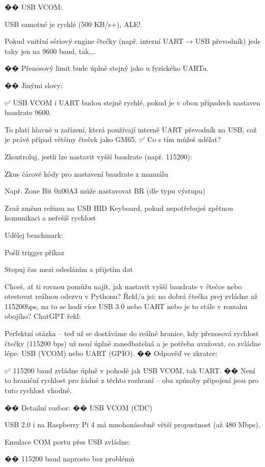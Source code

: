 �� USB VCOM:

    USB samotné je rychlé (500 KB/s+), ALE!

    Pokud vnitřní sériový engine čtečky (např. interní UART → USB převodník) jede taky jen na 9600 baud, tak...

    �� Přenosový limit bude úplně stejný jako u fyzického UARTu.

�� Jinými slovy:

    ✅ USB VCOM i UART budou stejně rychlé, pokud je v obou případech nastaven baudrate 9600.

To platí hlavně u zařízení, která používají interně UART převodník na USB, což je právě případ většiny čteček jako GM65.
✅ Co s tím můžeš udělat?

    Zkontroluj, jestli lze nastavit vyšší baudrate (např. 115200):

        Zkus čárové kódy pro nastavení baudrate z manuálu

        Např. Zone Bit 0x00A3 může nastavovat BR (dle typu výstupu)

    Zvaž změnu režimu na USB HID Keyboard, pokud nepotřebuješ zpětnou komunikaci a neřešíš rychlost

    Udělej benchmark:

        Pošli trigger příkaz

        Stopuj čas mezi odesláním a přijetím dat

Chceš, ať ti rovnou pomůžu najít, jak nastavit vyšší baudrate v čtečce nebo otestovat reálnou odezvu v Pythonu?
Řekl/a jsi:
no dobrá čtečka prej zvládne až 115200bps, na to se hodí více USB 3.0 nebo UART nebo je to stále v rozsahu obojího?
ChatGPT řekl:

Perfektní otázka – teď už se dostáváme do reálné hranice, kdy přenosová rychlost čtečky (115200 bps) už není úplně zanedbatelná a je potřeba uvažovat, co zvládne lépe: USB (VCOM) nebo UART (GPIO).
�� Odpověď ve zkratce:

    ✅ 115200 baud zvládne úplně v pohodě jak USB VCOM, tak UART.
    �� Není to hraniční rychlost pro žádné z těchto rozhraní – oba způsoby připojení jsou pro tuto rychlost vhodné.

�� Detailní rozbor:
�� USB VCOM (CDC)

    USB 2.0 i na Raspberry Pi 4 má mnohonásobně větší propustnost (až 480 Mbps).

    Emulace COM portu přes USB zvládne:

        �� 115200 baud naprosto bez problémů

